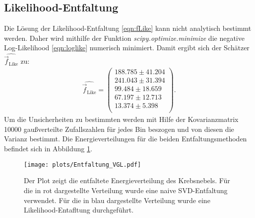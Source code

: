 \subsection{Likelihood-Entfaltung}
Die Lösung der Likelihood-Entfaltung \eqref{eqn:fLike} kann nicht analytisch bestimmt werden. Daher wird mithilfe der Funktion \textit{scipy.optimize.minimize} die negative Log-Likelihood \eqref{eqn:loglike} numerisch minimiert. Damit ergibt sich der Schätzer $\hat{\vec{f}_{\text{Like}}}$ zu:\\
\begin{align*}
	\hat{\vec{f}_{\text{Like}}} = \begin{pmatrix}
			188.785 \pm 41.204\\
			241.043 \pm 31.394\\
			99.484 \pm 18.659\\
			67.197 \pm 12.713\\
			13.374 \pm 5.398\\
	\end{pmatrix}.
\end{align*}
Um die Unsicherheiten zu bestimmten werden mit Hilfe der Kovarianzmatrix 10000 gaußverteilte Zufallszahlen für jedes Bin beszogen und von diesen die Varianz bestimmt.
Die Energieverteilungen für die beiden Entfaltungsmethoden befindet sich in Abbildung \ref{fig:E3}.
\begin{figure}
  \centering
  \texttt{[image: plots/Entfaltung\_VGL.pdf]}
  \caption{Der Plot zeigt die entfaltete Energieverteilung des Krebsnebels. Für die in rot dargestellte Verteilung wurde eine naive SVD-Entfaltung verwendet. Für die in blau dargestellte Verteilung wurde eine Likelihood-Entafltung durchgeführt.}
  \label{fig:E3}
\end{figure}
